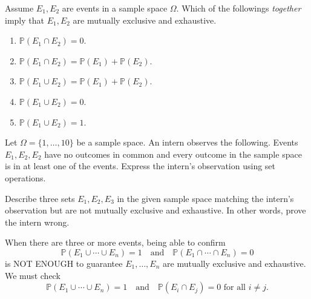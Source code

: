 \documentclass[../main.tex]{subfiles}
\begin{document}
%
\clearpage

\begin{example}
  Assume \(E_{1}, E_{2}\) are events in a sample space \(\Omega\).  Which of the followings \emph{together} imply that \(E_{1}, E_{2}\) are mutually exclusive and exhaustive. 
  \begin{enumerate}[label=(\alph*)]
    \item \(\mathbb{P}(E_{1} \cap E_{2}) = 0\).
    \item \(\mathbb{P}(E_{1} \cap E_{2}) = \mathbb{P}(E_{1}) + \mathbb{P}(E_{2})\).
    \item \(\mathbb{P}(E_{1} \cup E_{2}) = \mathbb{P}(E_{1}) + \mathbb{P}(E_{2})\).
    \item \(\mathbb{P}(E_{1} \cup E_{2}) = 0\).
    \item \(\mathbb{P}(E_{1} \cup E_{2}) = 1\).
  \end{enumerate}
\end{example}


\begin{example}
  Let \(\Omega = \{1,\ldots,10\}\) be a sample space.  An intern observes the following. Events \(E_{1}, E_{2}, E_{2}\) have no outcomes in common and every outcome in the sample space is in at least one of the events. Express the intern's observation using set operations.

  Describe three sets \(E_{1}, E_{2}, E_{3}\) in the given sample space matching the intern's observation but are not mutually exclusive and exhaustive.  In other words, prove the intern wrong.

  When there are three or more events, being able to confirm
  \[
    \mathbb{P}(E_{1} \cup \cdots \cup E_{n}) = 1 \quad\text{and}\quad \mathbb{P}(E_{1} \cap \cdots \cap E_{n}) = 0
  \]
  is NOT ENOUGH to guarantee \(E_{1}, \ldots, E_{n}\) are mutually exclusive and exhaustive. We must check
  \[
    \mathbb{P}(E_{1} \cup \cdots \cup E_{n}) = 1 \quad\text{and}\quad \mathbb{P}(E_{i} \cap E_{j}) = 0 \text{ for all } i \ne j.
  \]
\end{example}
\end{document}
